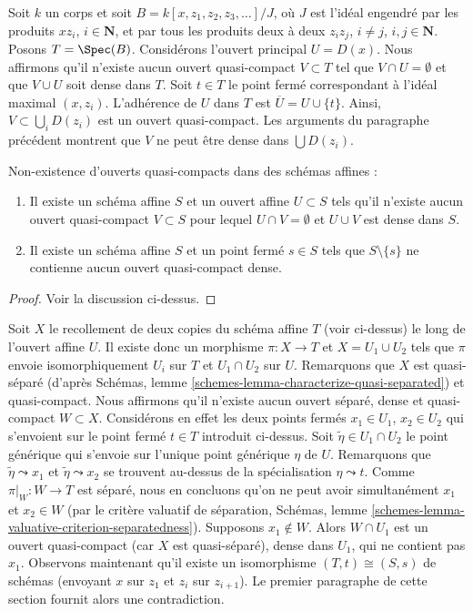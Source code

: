 \medskip\noindent
Soit $k$ un corps et soit $B = k[x, z_1, z_2, z_3, \ldots]/J$, où $J$
est l'idéal engendré par les produits $xz_i$, $i \in \mathbf{N}$, et par
tous les produits deux à deux $z_iz_j$, $i \not = j$, $i, j \in \mathbf{N}$.
Posons $T = \Spec(B)$. Considérons l'ouvert principal $U = D(x)$.
Nous affirmons qu'il n'existe aucun ouvert quasi-compact $V \subset T$ tel que
$V \cap U = \emptyset$ et que $V \cup U$ soit dense dans $T$.
Soit $t \in T$ le point fermé correspondant à l'idéal
maximal $(x, z_i)$. L'adhérence de $U$ dans $T$ est
$\overline{U} = U \cup \{t\}$. Ainsi, $V \subset \bigcup_i D(z_i)$
est un ouvert quasi-compact. Les arguments du paragraphe précédent
montrent que $V$ ne peut être dense dans $\bigcup D(z_i)$.

\begin{lemma}
\label{lemma-complement-of-affine-does-not-contain-qc-dense-open}
Non-existence d'ouverts quasi-compacts dans des schémas affines :
\begin{enumerate}
\item Il existe un schéma affine $S$ et un ouvert affine $U \subset S$
tels qu'il n'existe aucun ouvert quasi-compact $V \subset S$ pour lequel
$U \cap V = \emptyset$ et $U \cup V$ est dense dans $S$.
\item Il existe un schéma affine $S$ et un point fermé $s \in S$ tels que
$S \setminus \{s\}$ ne contienne aucun ouvert quasi-compact dense.
\end{enumerate}
\end{lemma}

\begin{proof}
Voir la discussion ci-dessus.
\end{proof}

\noindent
Soit $X$ le recollement de deux copies du schéma affine $T$ (voir ci-dessus)
le long de l'ouvert affine $U$. Il existe donc un morphisme $\pi : X \to T$ et
$X = U_1 \cup U_2$ tels que $\pi$ envoie isomorphiquement $U_i$ sur $T$ et
$U_1 \cap U_2$ sur $U$. Remarquons que $X$ est quasi-séparé
(d'après Schémas, lemme \ref{schemes-lemma-characterize-quasi-separated})
et quasi-compact. Nous affirmons qu'il n'existe aucun ouvert séparé, dense et
quasi-compact $W \subset X$. Considérons en effet les deux points fermés
$x_1 \in U_1$, $x_2 \in U_2$ qui s'envoient sur le point fermé $t \in T$
introduit ci-dessus. Soit $\tilde \eta \in U_1 \cap U_2$ le point générique
qui s'envoie sur l'unique point générique $\eta$ de $U$.
Remarquons que $\tilde\eta \leadsto x_1$ et $\tilde\eta \leadsto x_2$
se trouvent au-dessus de la spécialisation $\eta \leadsto t$.
Comme $\pi|_W : W \to T$ est séparé, nous en concluons qu'on ne peut avoir simultanément
$x_1$ et $x_2 \in W$ (par le critère valuatif de séparation,
Schémas, lemme \ref{schemes-lemma-valuative-criterion-separatedness}).
Supposons $x_1 \not \in W$. Alors $W \cap U_1$ est un ouvert quasi-compact (car $X$
est quasi-séparé), dense dans $U_1$, qui ne contient pas $x_1$.
Observons maintenant qu'il existe un isomorphisme $(T, t) \cong (S, s)$
de schémas (envoyant $x$ sur $z_1$ et $z_i$ sur $z_{i + 1}$).
Le premier paragraphe de cette section fournit alors une contradiction.


